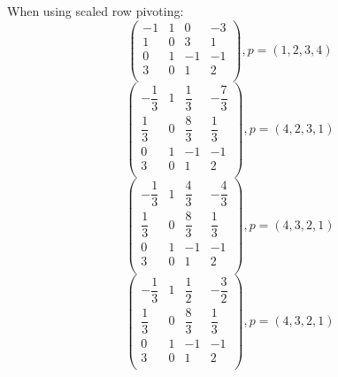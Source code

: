 When using scaled row pivoting:
\begin{equation*}
\left( \begin{array}{cccc}
-1 & 1 & 0 & -3\\
1 & 0 & 3 & 1\\
0 & 1 & -1 & -1\\
3 & 0 & 1 & 2\\
\end{array} \right) , p = (1,2,3,4)
\end{equation*}
\begin{equation*}
\left( \begin{array}{cccc}
-\dfrac{1}{3} & 1 & \dfrac{1}{3} & -\dfrac{7}{3}\\
\dfrac{1}{3} & 0 & \dfrac{8}{3} & \dfrac{1}{3}\\
0 & 1 & -1 & -1\\
3 & 0 & 1 & 2\\
\end{array} \right) , p = (4,2,3,1)
\end{equation*}
\begin{equation*}
\left( \begin{array}{cccc}
-\dfrac{1}{3} & 1 & \dfrac{4}{3} & -\dfrac{4}{3}\\
\dfrac{1}{3} & 0 & \dfrac{8}{3} & \dfrac{1}{3}\\
0 & 1 & -1 & -1\\
3 & 0 & 1 & 2\\
\end{array} \right) , p = (4,3,2,1)
\end{equation*}
\begin{equation*}
\left( \begin{array}{cccc}
-\dfrac{1}{3} & 1 & \dfrac{1}{2} & -\dfrac{3}{2}\\
\dfrac{1}{3} & 0 & \dfrac{8}{3} & \dfrac{1}{3}\\
0 & 1 & -1 & -1\\
3 & 0 & 1 & 2\\
\end{array} \right) , p = (4,3,2,1)
\end{equation*}
